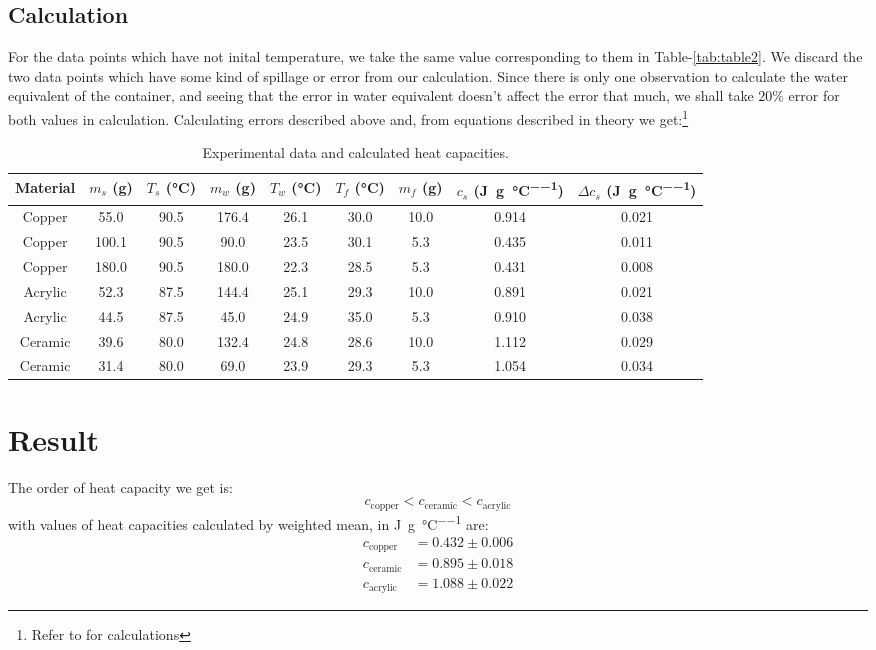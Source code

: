 \documentclass[%
 sor,
 jor,
 amsmath,amssymb,
 reprint,%
]{revtex4-2}
\begin{document}
\subsection{Calculation}
For the data points which have not inital temperature, we take the same value corresponding to them in Table-\ref{tab:table2}. We discard the two data points which have some kind of spillage or error from our calculation. Since there is only one observation to calculate the water equivalent of the container, and seeing that the error in water equivalent doesn't affect the error that much, we shall take $20\%$ error for both values in calculation.
Calculating errors described above and, from equations described in theory we get:\footnote{Refer to \cite{github} for calculations }
\begin{table}[htbp]
\centering
\begin{tabular}{c|
S[table-format=3.1]
S[table-format=3.1]
S[table-format=3.1]
S[table-format=2.1]
S[table-format=2.1]
S[table-format=2.1]
S[table-format=1.3]
S[table-format=1.3]
}
\toprule
Material & {$m_s$ (\si{\gram})} & {$T_s$ (\si{\celsius})} & {$m_w$ (\si{\gram})} & {$T_w$ (\si{\celsius})} & {$T_f$ (\si{\celsius})} & {$m_f$ (\si{\gram})} & {$c_s$ (\si{\joule\per\gram\per\celsius})} & {$\Delta c_s$ (\si{\joule\per\gram\per\celsius})} \\
\midrule
Copper & 55.0  & 90.5  & 176.4  & 26.1  & 30.0  & 10.0 & 0.914 & 0.021 \\
Copper & 100.1 & 90.5  & 90.0   & 23.5  & 30.1  & 5.3  & 0.435 & 0.011 \\
Copper  & 180.0 & 90.5  & 180.0  & 22.3  & 28.5  & 5.3  & 0.431 & 0.008 \\
Acrylic & 52.3  & 87.5  & 144.4  & 25.1  & 29.3  & 10.0 & 0.891 & 0.021 \\
Acrylic & 44.5  & 87.5  & 45.0   & 24.9  & 35.0  & 5.3  & 0.910 & 0.038 \\
Ceramic & 39.6  & 80.0  & 132.4  & 24.8  & 28.6  & 10.0 & 1.112 & 0.029 \\
Ceramic & 31.4  & 80.0  & 69.0   & 23.9  & 29.3  & 5.3  & 1.054 & 0.034 \\
\bottomrule
\end{tabular}
\caption{Experimental data and calculated heat capacities.}
\label{tab:heat_capacity}
\end{table}

\section{Result}
The order of heat capacity we get is: 
$$c_{\text{copper}}<c_{\text{ceramic}}<c_{\text{acrylic}}$$
with values of heat capacities calculated by weighted mean, in \si{\joule\per\gram\per\celsius} are: 
\[
\boxed{
\begin{split}
c_{\text{copper}} &= 0.432 \pm 0.006 \\
c_{\text{ceramic}} &= 0.895 \pm 0.018\\
c_{\text{acrylic}} &= 1.088 \pm 0.022
\end{split}
}
\]
\end{document}
